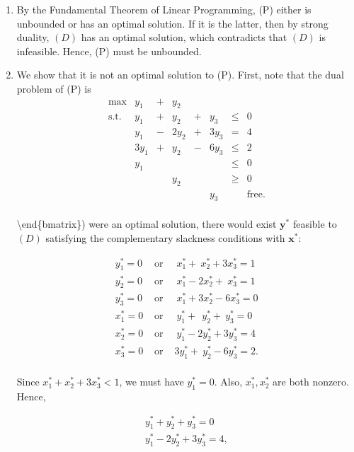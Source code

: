 \documentclass[]{book}
\def\lt{<}
\renewcommand{\vec}[1]{\mathbf{#1}}
\theoremstyle{definition}
\theoremstyle{definition}
\theoremstyle{remark}
\begin{document}
\begin{enumerate}
\def\labelenumi{\arabic{enumi}.}
\item
  By the Fundamental Theorem of Linear Programming, (P) either is
  unbounded or has an optimal solution. If it is the latter, then by
  strong duality, \((D)\) has an optimal solution, which contradicts
  that \((D)\) is infeasible. Hence, (P) must be unbounded.
\item
  We show that it is not an optimal solution to (P). First, note that
  the dual problem of (P) is \[\begin{array}{rrcrcrlll}
  \max & y_1 & +& y_2  &   &       \\
  \mbox{s.t.} 
  &  y_1 & + &  y_2 & + &  y_3 & \leq & 0  \\
  &  y_1 & - & 2y_2 & + & 3y_3  & = & 4  \\
  & 3y_1 & + &  y_2 & - & 6y_3  & \leq & 2  \\
  &  y_1 &   &     &    &      & \leq & 0 \\
  &      &   & y_2  &   &      & \geq   &  0 \\
  &      &   &     &    & y_3  &    & \mbox{free.} \\
  \end{array}\]

  \textbackslash{}end\{bmatrix\}) were an optimal solution, there would
  exist \(\vec{y^*}\) feasible to \((D)\) satisfying the complementary
  slackness conditions with \(\vec{x}^*\):

  \begin{eqnarray*}
   y_1^* = 0 & \mbox{ or } &  ~x_1^* + ~x_2^* + 3x_3^* = 1 \\
   y_2^* = 0 & \mbox{ or } &  ~x_1^* - 2x_2^* +~x_3^* = 1 \\
   y_3^* = 0 & \mbox{ or } &  ~x_1^* + 3x_2^* - 6x_3^* = 0 \\
   x_1^* = 0 & \mbox{ or } &  ~y_1^* + ~~y_2^* + ~y_3^* = 0 \\
   x_2^* = 0 & \mbox{ or } &  ~y_1^*  - 2y_2^* + 3y_3^* =  4 \\
   x_3^* = 0 & \mbox{ or } &  3y_1^*  + ~y_2^* - 6y_3^* =  2. \\
  \end{eqnarray*}

  Since \(x^*_1 + x_2^* + 3x_3^* \lt 1\), we must have \(y_1^* = 0\).
  Also, \(x_1^*, x_2^*\) are both nonzero. Hence,

  \begin{eqnarray*}
  y_1^* + y_2^* + y_3^* = 0~ \\
  y_1^* - 2y_2^* + 3y_3^* = 4,
  \end{eqnarray*}


\end{enumerate}
\end{document}
